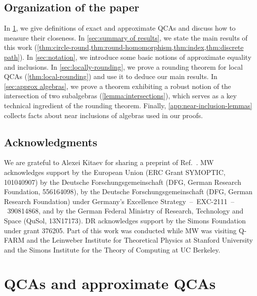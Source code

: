 \documentclass[11pt,reqno]{amsart}
\theoremstyle{definition}
\theoremstyle{remark}
\numberwithin{equation}{section}
\begin{document}
\subsection{Organization of the paper}
In \cref{sec:qcas}, we give definitions of exact and approximate QCAs and discuss how to measure their closeness.
In \cref{sec:summary of results}, we state the main results of this work (\cref{thm:circle-round,thm:round-homomorphism,thm:index,thm:discrete path}).
In \cref{sec:notation}, we introduce some basic notions of approximate equality and inclusions.
In \cref{sec:locally-rounding}, we prove a rounding theorem for local QCAs (\cref{thm:local-rounding}) and use it to deduce our main results.
In \cref{sec:approx algebras}, we prove a theorem exhibiting a robust notion of the intersection of two subalgebras (\cref{lemma:intersections}), which serves as a key technical ingredient of the rounding theorem.
Finally, \cref{app:near-inclusion-lemmas} collects facts about near inclusions of algebras used in our proofs.


\subsection{Acknowledgments}
We are grateful to Alexei Kitaev for sharing a preprint of Ref.~\cite{kitaev2024almost}.
MW acknowledges support by the European Union (ERC Grant SYMOPTIC, 101040907) by the Deutsche Forschungsgemeinschaft (DFG, German Research Foundation, 556164098), by the Deutsche Forschungsgemeinschaft (DFG, German Research Foundation) under Germany's Excellence Strategy~--~EXC-2111~--~390814868, and by the German Federal Ministry of Research, Technology and Space (QuSol, 13N17173).
DR acknowledges support by the Simons Foundation under grant 376205.
Part of this work was conducted while MW was visiting Q-FARM and the Leinweber Institute for Theoretical Physics at Stanford University and the Simons Institute for the Theory of Computing at UC Berkeley.

\section{QCAs and approximate QCAs}\label{sec:qcas}
\end{document}
